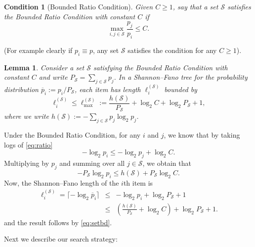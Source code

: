 \documentclass[conference]{IEEEtran}
\newtheorem{lemma}[theorem]{Lemma}
\newtheorem{condition}{Condition}
\newcommand{\ol}[1]{\overline{#1}}
\newcommand{\setS}{{\mathcal{S}}}
\begin{document}
\begin{condition}[Bounded Ratio Condition] \label{cond:ratio}
Given $C \geq 1$, say that a set $\setS$ satisfies the Bounded Ratio Condition with constant $C$ if
\begin{equation} \label{eq:ratio} \max_{i,j \in \setS} \frac{p_j}{p_i} \leq C.\end{equation} \end{condition}
%
(For example clearly if $p_i \equiv p$, any set $\setS$ satisfies the condition for any $C \geq 1$).
%
\begin{lemma} \label{lem:sfstep}
Consider a set $\setS$ satisfying the Bounded Ratio Condition  with constant $C$
and write $P_{\setS} = \sum_{j \in \setS} p_j$.
In a  Shannon--Fano tree for the probability distribution $\ol{p}_i := p_i/P_{\setS}$, each item has length $\ell_i^{(\setS)}$
bounded by
\begin{equation} \label{eq:depth} \ell_i^{(\setS)} \leq \ell_{\max}^{(\setS)} := \frac{h(\setS)}{P_{\setS}} + \log_2  C + \log_2  P_{\setS} + 1,\end{equation}
where we write $h( \setS) :=  -\sum_{j \in \setS} p_j \log_2  p_j$.
\end{lemma}
\begin{IEEEproof} Under the Bounded Ratio Condition, for any $i$ and $j$, we know that by taking logs of \eqref{eq:ratio}
$$ -\log_2 p_i \leq - \log_2 p_j + \log_2 C.$$
Multiplying by $p_j$ and summing over all $j \in \setS$, we obtain that
\begin{equation} \label{eq:setbd} -P_{\setS} \log_2 p_i \leq h(\setS) + P_{\setS} \log_2 C.\end{equation}
Now, the Shannon--Fano length of the $i$th item is
\begin{eqnarray}
 \ell_i^{(\setS)}  = \lceil -\log_2 \ol{p}_i \rceil 
& \leq &  -\log_2 p_i + \log_2 P_{\setS} + 1 \label{eq:lengthbd} \\
& \leq  & \left(\frac{h(\setS)}{P_{\setS}} + \log_2 C \right) + \log_2 P_{\setS} + 1. \nonumber
\end{eqnarray}
and the result follows by \eqref{eq:setbd}.
\end{IEEEproof}

Next we describe our search strategy:
\end{document}
